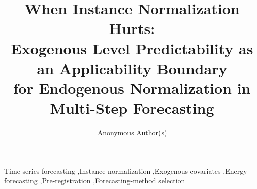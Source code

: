 \documentclass[preprint,12pt,authoryear]{elsarticle}
\theoremstyle{remark}
\begin{document}
\begin{frontmatter}

\title{When Instance Normalization Hurts:\\
Exogenous Level Predictability as an Applicability Boundary\\
for Endogenous Normalization in Multi-Step Forecasting}

\author{Anonymous Author(s)}

\begin{abstract}

\end{abstract}

\begin{keyword}
Time series forecasting \sep Instance normalization \sep Exogenous covariates
\sep Energy forecasting \sep Pre-registration \sep Forecasting-method selection
\end{keyword}

\end{frontmatter}










\appendix
\renewcommand{\thesection}{\Alph{section}}




\clearpage  %


\end{document}
